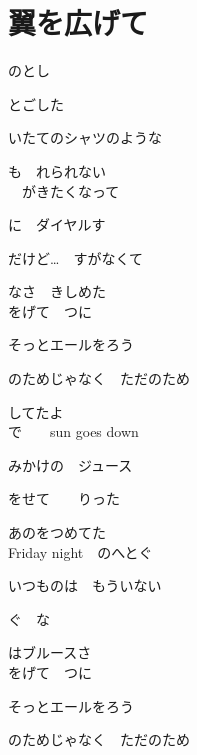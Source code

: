 \section{ 翼を広げて}
\large{

のとし

とごした

いたてのシャツのような

も　れられない
\\

　がきたくなって

に　ダイヤルす

だけど…　すがなくて

なさ　きしめた
\\

をげて　つに

そっとエールをろう

のためじゃなく　ただのため

してたよ
\\

で　　sun goes down

みかけの　ジュース

をせて　　りった

あのをつめてた
\\

Friday night　のへとぐ

いつものは　もういない

ぐ　な

はブルースさ
\\

をげて　つに

そっとエールをろう

のためじゃなく　ただのため

}
